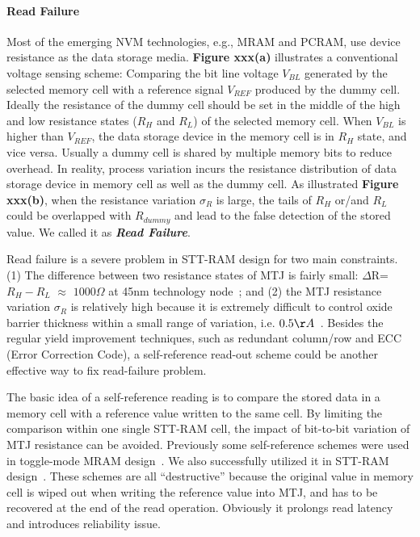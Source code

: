 \paragraph{Read Failure}
Most of the emerging NVM technologies, e.g., MRAM and PCRAM, use device resistance as the data storage media. \textbf{Figure xxx(a)} illustrates a conventional voltage sensing scheme: Comparing the bit line voltage $V_{BL}$ generated by the selected memory cell with a reference signal $V_{REF}$ produced by the dummy cell. Ideally the resistance of the dummy cell should be set in the middle of the high and low resistance states ($R_H$ and $R_L$) of the selected memory cell. When $V_{BL}$ is higher than $V_{REF}$, the data storage device in the memory cell is in $R_H$ state, and vice versa. Usually a dummy cell is shared by multiple memory bits to reduce overhead. In reality, process variation incurs the resistance distribution of data storage device in memory cell as well as the dummy cell. As illustrated \textbf{Figure xxx(b)}, when the resistance variation $\sigma_R$ is large, the tails of $R_H$ or/and $R_L$ could be overlapped with $R_{dummy}$ and lead to the false detection of the stored value. We called it as \textbf{\emph{Read Failure}}.

Read failure is a severe problem in STT-RAM design for two main constraints. (1) The difference between two resistance states of MTJ is fairly small: $\Delta$R=$R_H-R_L$ $\approx$ $1000\Omega$ at 45nm technology node~\cite{Li09}; and (2) the MTJ resistance variation $\sigma_R$ is relatively high because it is extremely difficult to control oxide barrier thickness within a small range of variation, i.e. $0.5{\AA}$~\cite{Jeong03}. Besides the regular yield improvement techniques, such as redundant column/row and ECC (Error Correction Code), a self-reference read-out scheme could be another effective way to fix read-failure problem.

The basic idea of a self-reference reading is to compare the stored data in a memory cell with a reference value written to the same cell. By limiting the comparison within one single STT-RAM cell, the impact of bit-to-bit variation of MTJ resistance can be avoided. Previously some self-reference schemes were used in toggle-mode MRAM design~\cite{Tanizaki06,Jeong03}. We also successfully utilized it in STT-RAM design~\cite{Li:147723}. These schemes are all ``destructive'' because the original value in memory cell is wiped out when writing the reference value into MTJ, and has to be recovered at the end of the read operation. Obviously it prolongs read latency and introduces reliability issue.

